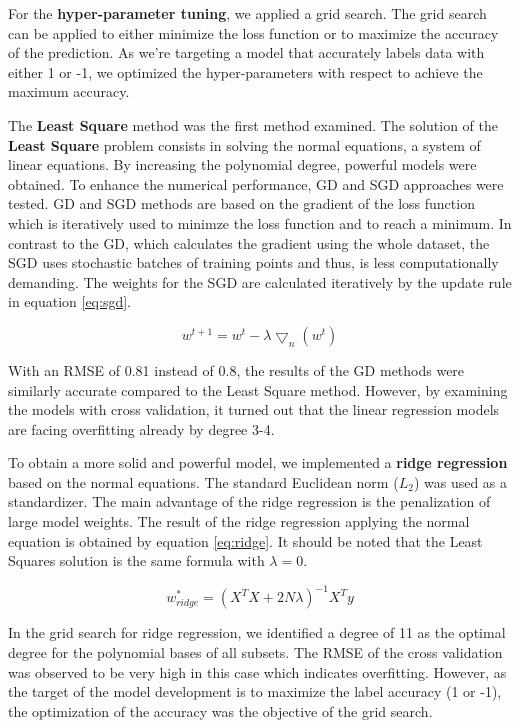 \documentclass[10pt,conference,compsocconf]{IEEEtran}
\begin{document}
For the \textbf{hyper-parameter tuning}, we applied a grid search. The grid search can be applied to either minimize the loss function or to maximize the accuracy of the prediction. As we're targeting a model that accurately labels data with either 1 or -1, we optimized the hyper-parameters with respect to achieve the maximum accuracy. 

The \textbf{Least Square} method was the first method examined. The solution of the \textbf{Least Square} problem consists in solving the normal equations, a system of linear equations. By increasing the polynomial degree, powerful models were obtained. To enhance the numerical performance, GD and SGD approaches were tested. GD and SGD methods are based on the gradient of the loss function which is iteratively used to minimze the loss function and to reach a minimum. In contrast to the GD, which calculates the gradient using the whole dataset, the SGD uses stochastic batches of training points and thus, is less computationally demanding. The weights for the SGD are calculated iteratively by the update rule in equation \ref{eq:sgd}.

\begin{equation}
\label{eq:sgd}
w^{t+1} = w^{t} - \lambda  \bigtriangledown _{n} (w^{t})
\end{equation}

With an RMSE of 0.81 instead of 0.8, the results of the GD methods were similarly accurate compared to the Least Square method.
However, by examining the models with cross validation, it turned out that the linear regression models are facing overfitting already by degree 3-4.

To obtain a more solid and powerful model, we implemented a \textbf{ridge regression} based on the normal equations. The standard Euclidean norm ($L_{2}$) was used as a standardizer. The main advantage of the ridge regression is the penalization of large model weights. The result of the ridge regression applying the normal equation is obtained by equation \ref{eq:ridge}. It should be noted that the Least Squares solution is the same formula with $\lambda=0$.

\begin{equation}
\label{eq:ridge}
w_{ridge}^{*}=(X^{T}X+2N\lambda)^{-1}X^{T}y
\end{equation}

In the grid search for ridge regression, we identified a degree of 11 as the optimal degree for the polynomial bases of all subsets. The RMSE of the cross validation was observed to be very high in this case which indicates overfitting. However, as the target of the model development is to maximize the label accuracy (1 or -1), the optimization of the accuracy was the objective of the grid search. 
\end{document}
